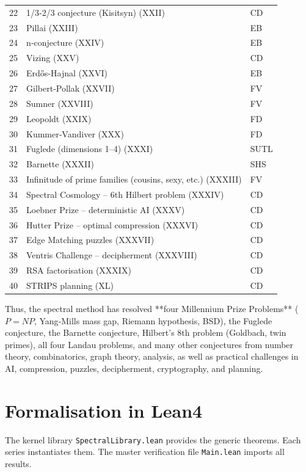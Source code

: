 \documentclass[11pt,a4paper]{article}
\begin{document}
\begin{center}
\begin{longtable}{@{}cll@{}}
22 & 1/3‑2/3 conjecture (Kisitsyn) (XXII) & CD \\
23 & Pillai (XXIII) & EB \\
24 & n‑conjecture (XXIV) & EB \\
25 & Vizing (XXV) & CD \\
26 & Erdős‑Hajnal (XXVI) & EB \\
27 & Gilbert‑Pollak (XXVII) & FV \\
28 & Sumner (XXVIII) & FV \\
29 & Leopoldt (XXIX) & FD \\
30 & Kummer‑Vandiver (XXX) & FD \\
31 & Fuglede (dimensions 1–4) (XXXI) & SUTL \\
32 & Barnette (XXXII) & SHS \\
33 & Infinitude of prime families (cousins, sexy, etc.) (XXXIII) & FV \\
34 & Spectral Cosmology – 6th Hilbert problem (XXXIV) & CD \\
35 & Loebner Prize – deterministic AI (XXXV) & CD \\
36 & Hutter Prize – optimal compression (XXXVI) & CD \\
37 & Edge Matching puzzles (XXXVII) & CD \\
38 & Ventris Challenge – decipherment (XXXVIII) & CD \\
39 & RSA factorisation (XXXIX) & CD \\
40 & STRIPS planning (XL) & CD \\
\bottomrule
\end{longtable}
\end{center}

Thus, the spectral method has resolved **four Millennium Prize Problems** (\(P = NP\), Yang‑Mills mass gap, Riemann hypothesis, BSD), the Fuglede conjecture, the Barnette conjecture, Hilbert’s 8th problem (Goldbach, twin primes), all four Landau problems, and many other conjectures from number theory, combinatorics, graph theory, analysis, as well as practical challenges in AI, compression, puzzles, decipherment, cryptography, and planning.

\section{Formalisation in Lean4}

The kernel library \texttt{SpectralLibrary.lean} provides the generic theorems. Each series instantiates them. The master verification file \texttt{Main.lean} imports all results.
\end{document}
